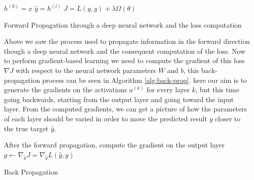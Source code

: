 \documentclass[14pt]{extarticle}
\numberwithin{equation}{section}
\begin{document}
	\begin{algorithm}[H]
		\DontPrintSemicolon
		\SetAlgoLined
		\BlankLine
		$h^{(0)} = x$\;
		$\hat{y} = h^{(l)}$\;
		$J = L(\hat{y},y) + \lambda	\Omega(\theta)$
		
		\caption{Forward Propagation through a deep neural network and the loss computation}\label{alg:forward-prop}
	\end{algorithm}
	
	Above we saw the process used to propagate information in the forward direction though a deep neural network and the consequent computation of the loss. Now to perform gradient-based learning we need to compute the gradient of this loss $\nabla J$ with respect to the neural network parameters $W$ and $b$, this back-propagation process can be seen in Algorithm \ref{alg:back-prop}. here our aim is to generate the gradients on the activations $a^(k)$ for every layer $k$, but this time going backwards, starting from the output layer and going toward the input layer. From the computed gradients, we can get a picture of how the parameters of each layer should be varied in order to move the predicted result $y$ closer to the true target $\hat{y}$.
	\begin{algorithm}[H]
		\DontPrintSemicolon
		\SetAlgoLined
		After the forward propagation, compute the gradient on the output layer\;
		$g \leftarrow \nabla_{\hat{y}}J = \nabla_{\hat{y}}L(\hat{y}, y)$\;
		\caption{Back Propagation}\label{alg:back-prop}
	\end{algorithm}
\end{document}
